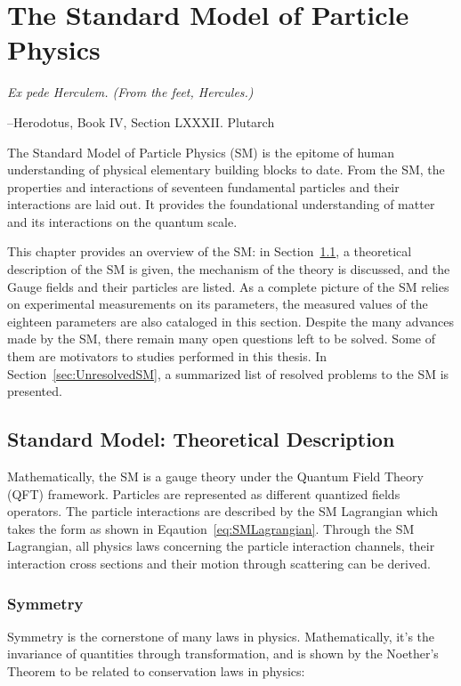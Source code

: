 \chapter{The Standard Model of Particle Physics}
\label{chapter:SM}


\epigraph{\textit{Ex pede Herculem. \newline(From the feet, Hercules.)}}{--Herodotus, Book IV, Section LXXXII. Plutarch}

The Standard Model of Particle Physics (SM) is the epitome of human understanding of physical elementary building blocks to date. From the SM, the properties and interactions of seventeen fundamental particles and their interactions are laid out. It provides the foundational understanding of matter and its interactions on the quantum scale.

This chapter provides an overview of the SM: in Section~\ref{sec:SM}, a theoretical description of the SM is given, the mechanism of the theory is discussed, and the Gauge fields and their particles are listed. As a complete picture of the SM relies on experimental measurements on its parameters, the measured values of the eighteen parameters are also cataloged in this section. Despite the many advances made by the SM, there remain many open
questions left to be solved. Some of them are motivators to studies performed in this thesis. In Section~\ref{sec:UnresolvedSM}, a summarized list of resolved problems to the SM is presented.

\section{Standard Model: Theoretical Description}
\label{sec:SM}

Mathematically, the SM is a gauge theory under the 
Quantum Field Theory (QFT) framework. Particles are represented as different quantized fields operators. The particle interactions are described by the SM Lagrangian which takes the form as shown in Eqaution~\ref{eq:SMLagrangian}. Through the SM Lagrangian, all physics laws concerning the particle interaction channels, their interaction cross sections and their motion through scattering can be derived.

\subsection{Symmetry}
Symmetry is the cornerstone of many laws in physics. Mathematically, it's the invariance of quantities through transformation, and is shown by the Noether's Theorem\cite{sarlet1981generalizations} to be related to conservation laws in physics:

